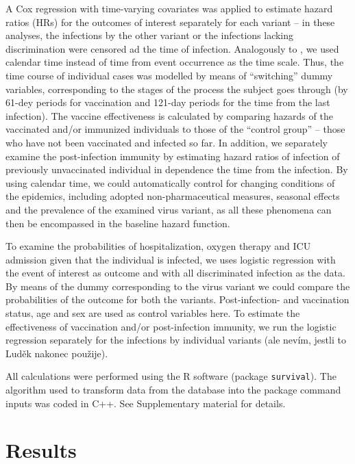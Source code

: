\documentclass[preprint,12pt,authoryear]{elsarticle}
\begin{document}
A Cox regression with time-varying covariates was applied to estimate hazard ratios (HRs) for the outcomes of interest separately for each variant -- in these analyses, the infections by the other variant or the infections lacking discrimination were censored ad the time of infection. Analogously to \cite{tartof2021effectiveness}, we used calendar time instead of time from event occurrence as the time scale. Thus, the time course of individual cases was modelled by means of ``switching'' dummy variables, corresponding to the stages of the process the subject goes through (by 61-dey periods for vaccination and 121-day periods for the time from the last infection).
The vaccine effectiveness is calculated by comparing hazards of the vaccinated and/or immunized individuals to those of the  ``control group'' -- those who have not been vaccinated and infected so far. In addition, we separately examine the post-infection immunity by estimating hazard ratios of infection of previously unvaccinated individual in dependence the time from the infection. By using calendar time, we could automatically control for changing conditions of the epidemics, including adopted non-pharmaceutical measures, seasonal effects and the prevalence of the examined virus variant, as all these phenomena can then be encompassed in the baseline hazard function. 






To examine the probabilities of hospitalization, oxygen therapy and ICU admission given that the individual is infected, we uses logistic regression with the event of interest as outcome and with all discriminated infection as the data. By means of the dummy corresponding to the virus variant we could compare the probabilities of the outcome for both the variants. Post-infection- and vaccination status, age and sex are used as control variables here. To estimate the effectiveness of vaccination and/or post-infection immunity, we run the logistic regression separately for the infections by individual variants (ale nevím, jestli to Luděk nakonec použije).

 
All calculations were performed using the R software (package \verb|survival|). The algorithm used to transform data from the database into the package command inputs was coded in C++. See Supplementary material for details. 

\section{Results}
\label{sec3}
\end{document}

